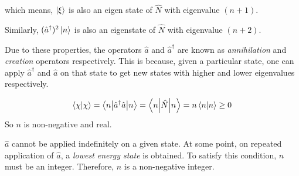 \documentclass[12pt,a4paper,answers]{exam}
\renewcommand{\a}{\hat{a}}
\newcommand{\ad}{\hat{a}^{\dagger}}
\newcommand{\N}{\hat{N}}
\begin{document}
\begin{questions}
\begin{solutionorbox}
		which means, $ \ket{\xi} $ is also an eigen state of $ \N $ with eigenvalue $ (n+1) $.
		
		Similarly, $ (\ad)^2 \ket{n} $ is also an eigenstate of $ \N $ with eigenvalue $ (n+2) $.
		
		Due to these properties, the operators $ \a $ and $ \ad $ are known as \emph{annihilation} and \emph{creation} operators respectively. This is because, given a particular state, one can apply $ \ad $ and $ \a $ on that state to get new states with higher and lower eigenvalues respectively.
		
		\begin{dmath*}
			\braket{\chi} = \ev**{\ad\a}{n}
			= \ev**{\N}{n}
			= n \braket{n}
			\geq 0
		\end{dmath*}
		So $ n $ is non-negative and real.
		
		$ \a $ cannot be applied indefinitely on a given state. At some point, on repeated application of $ \a $, a \emph{lowest energy state} is obtained. To satisfy this condition, $ n $ must be an integer. Therefore, $ n $ is a non-negative integer.
		

\end{solutionorbox}
\end{questions}
\end{document}
